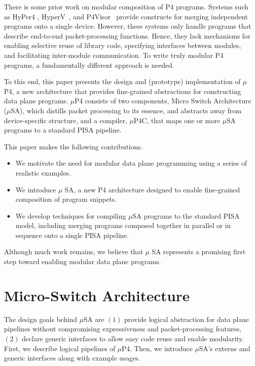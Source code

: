 There is some prior work on modular composition of P4 programs.
Systems such as HyPer4 \cite{Hancock:2016:HUP:2999572.2999607},
HyperV~\cite{8038396}, and
P4Visor~\cite{Zheng:2018:PLV:3281411.3281436} provide constructs for
merging independent programs onto a single device. However, these
systems only handle programs that describe end-to-end
packet-processing functions. Hence, they lack mechanisms for enabling
selective reuse of library code, specifying interfaces between
modules, and facilitating inter-module communication. To write truly
modular P4 programs, a fundamentally different approach is needed.

To this end, this paper presents the design and (prototype)
implementation of $\mu$P4, a new architecture that provides
fine-grained abstractions for constructing data plane programs.
$\mu$P4 consists of two components, Micro Switch Architecture
($\mu$SA), which distills packet processing to its essence, and
abstracts away from device-specific structure, and a compiler,
$\mu$P4C, that maps one or more $\mu$SA programs to a standard PISA
pipeline. 

This paper makes the following contributions.
\begin{itemize}
\item We motivate the need for modular data plane programming using a
  series of realistic examples.
\item We introduce $\mu$ SA, a new P4 architecture designed to enable
  fine-grained composition of program snippets.
\item We develop techniques for compiling $\mu$SA programs to the
  standard PISA model, including merging programs composed together in
  parallel or in sequence onto a single PISA pipeline.
\end{itemize}

Although much work remains, we believe that $\mu$ SA represents a
promising first step toward enabling modular data plane programs.

\section{Micro-Switch Architecture}
\label{section:micros-awitch-architecture}
The design goals behind $\mu$SA are $(1)$ provide logical abstraction for data plane pipelines without compromising expressiveness and packet-processing features, $(2)$ declare generic interfaces to allow easy code reuse and enable modularity.
First, we describe logical pipelines of $\mu$P4. Then, we introduce $\mu$SA's externs and generic interfaces along with example usages.

